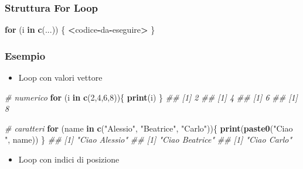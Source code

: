 \documentclass[
]{book}
\newenvironment{Shaded}{\begin{snugshade}}{\end{snugshade}}
\newcommand{\CommentTok}[1]{\textcolor[rgb]{0.56,0.35,0.01}{\textit{#1}}}
\newcommand{\ControlFlowTok}[1]{\textcolor[rgb]{0.13,0.29,0.53}{\textbf{#1}}}
\newcommand{\DecValTok}[1]{\textcolor[rgb]{0.00,0.00,0.81}{#1}}
\newcommand{\KeywordTok}[1]{\textcolor[rgb]{0.13,0.29,0.53}{\textbf{#1}}}
\newcommand{\NormalTok}[1]{#1}
\newcommand{\OperatorTok}[1]{\textcolor[rgb]{0.81,0.36,0.00}{\textbf{#1}}}
\newcommand{\StringTok}[1]{\textcolor[rgb]{0.31,0.60,0.02}{#1}}
\providecommand{\tightlist}{%
  \setlength{\itemsep}{0pt}\setlength{\parskip}{0pt}}
\begin{document}
\hypertarget{struttura-for-loop}{%
\subsubsection*{Struttura For Loop}\label{struttura-for-loop}}

\begin{Shaded}
\begin{Highlighting}[]
\ControlFlowTok{for}\NormalTok{ (i }\ControlFlowTok{in} \KeywordTok{c}\NormalTok{(...)) \{}
    \OperatorTok{<}\NormalTok{codice}\OperatorTok{-}\NormalTok{da}\OperatorTok{-}\NormalTok{eseguire}\OperatorTok{>}
\NormalTok{\}}
\end{Highlighting}
\end{Shaded}

\hypertarget{esempio-5}{%
\subsubsection*{Esempio}\label{esempio-5}}

\begin{itemize}
\tightlist
\item
  Loop con valori vettore
\end{itemize}

\begin{Shaded}
\begin{Highlighting}[]
\CommentTok{# numerico}
\ControlFlowTok{for}\NormalTok{ (i }\ControlFlowTok{in} \KeywordTok{c}\NormalTok{(}\DecValTok{2}\NormalTok{,}\DecValTok{4}\NormalTok{,}\DecValTok{6}\NormalTok{,}\DecValTok{8}\NormalTok{))\{}
  \KeywordTok{print}\NormalTok{(i)}
\NormalTok{\}}
\CommentTok{## [1] 2}
\CommentTok{## [1] 4}
\CommentTok{## [1] 6}
\CommentTok{## [1] 8}

\CommentTok{# caratteri}
\ControlFlowTok{for}\NormalTok{ (name }\ControlFlowTok{in} \KeywordTok{c}\NormalTok{(}\StringTok{"Alessio"}\NormalTok{, }\StringTok{"Beatrice"}\NormalTok{, }\StringTok{"Carlo"}\NormalTok{))\{}
  \KeywordTok{print}\NormalTok{(}\KeywordTok{paste0}\NormalTok{(}\StringTok{"Ciao "}\NormalTok{, name))}
\NormalTok{\}}
\CommentTok{## [1] "Ciao Alessio"}
\CommentTok{## [1] "Ciao Beatrice"}
\CommentTok{## [1] "Ciao Carlo"}
\end{Highlighting}
\end{Shaded}

\begin{itemize}
\tightlist
\item
  Loop con indici di posizione
\end{itemize}
\end{document}
